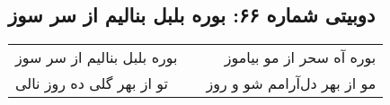 \begin{center}
\section*{دوبیتی شماره ۶۶: بوره بلبل بنالیم از سر سوز}
\label{sec:066}
\begin{longtable}{l p{0.5cm} r}
بوره بلبل بنالیم از سر سوز
&&
بوره آه سحر از مو بیاموز
\\
تو از بهر گلی ده روز نالی
&&
مو از بهر دل‌آرامم شو و روز
\\
\end{longtable}
\end{center}
